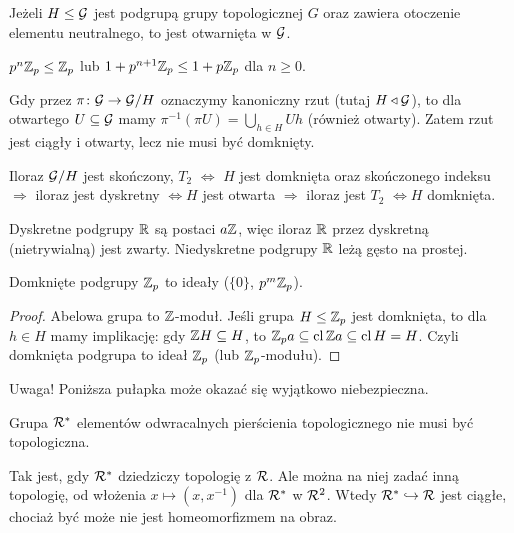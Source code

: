 \begin{fakt}
	Jeżeli $H \le \mathcal G$ jest podgrupą grupy topologicznej $G$ oraz zawiera otoczenie elementu neutralnego, to jest otwarnięta w $\mathcal G$.
\end{fakt}

\begin{przyklad}
	$p^n\mathbb Z_p \le \mathbb Z_p$ lub $1+p^{n+1}\mathbb Z_p \le 1 + p\mathbb Z_p$ dla $n \ge 0$.
\end{przyklad}

Gdy przez $\pi \colon \mathcal G \to \mathcal G / H$ oznaczymy kanoniczny rzut (tutaj $H \triangleleft \mathcal G$), to dla otwartego $U \subseteq \mathcal G$ mamy $\pi^{-1} (\pi U) = \bigcup_{h \in H} Uh$ (również otwarty).
Zatem rzut jest ciągły i otwarty, lecz nie musi być domknięty.

\begin{fakt}
	Iloraz $\mathcal G/H$ jest skończony, $T_2$ $\Leftrightarrow$ $H$ jest domknięta oraz skończonego indeksu $\Rightarrow$ iloraz jest dyskretny $\Leftrightarrow H$ jest otwarta $\Rightarrow$ iloraz jest $T_2$ $\Leftrightarrow H$ domknięta.
\end{fakt}

Dyskretne podgrupy $\mathbb R$ są postaci $a\mathbb Z$, więc iloraz $\mathbb R$ przez dyskretną (nietrywialną) jest zwarty.
Niedyskretne podgrupy $\mathbb R$ leżą gęsto na prostej.

\begin{fakt}
	Domknięte podgrupy $\mathbb Z_p$ to ideały ($\{0\}$, $p^m \mathbb Z_p$).
\end{fakt}

\begin{proof}
	Abelowa grupa to $\mathbb Z$-moduł.
	Jeśli grupa $H \le \mathbb Z_p$ jest domknięta, to dla $h \in H$ mamy implikację: gdy $\mathbb Z H \subseteq H$, to $\mathbb Z_p a \subseteq \operatorname{cl} \mathbb Z a \subseteq \operatorname{cl} H = H$.
	Czyli domknięta podgrupa to ideał $\mathbb Z_p$ (lub $\mathbb Z_p$-modułu).
\end{proof}

Uwaga! 
Poniższa pułapka może okazać się wyjątkowo niebezpieczna.

\begin{fakt}
	Grupa $\mathcal R^*$ elementów odwracalnych pierścienia topologicznego nie musi być topologiczna.
\end{fakt}

Tak jest, gdy $\mathcal R^*$ dziedziczy topologię z $\mathcal R$.
Ale można na niej zadać inną topologię, od włożenia $x \mapsto (x, x^{-1})$ dla $\mathcal R^*$ w $\mathcal R^2$.
Wtedy $\mathcal R^* \hookrightarrow \mathcal R$ jest ciągłe, chociaż być może nie jest homeomorfizmem na obraz.

